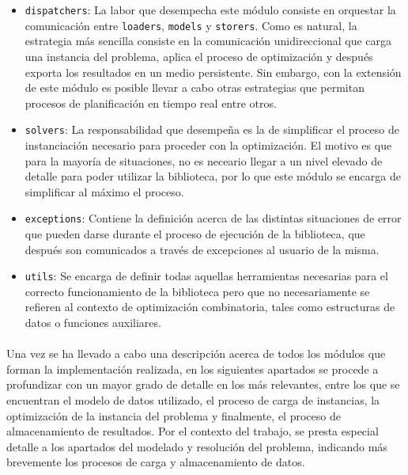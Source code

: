 \documentclass{subfiles}
\begin{document}
          \begin{itemize}

              \item \texttt{dispatchers}: La labor que desempecha este módulo consiste en orquestar la comunicación entre \texttt{loaders}, \texttt{models} y \texttt{storers}. Como es natural, la estrategia más sencilla consiste en la comunicación unidireccional que carga una instancia del problema, aplica el proceso de optimización y después exporta los resultados en un medio persistente. Sin embargo, con la extensión de este módulo es posible llevar a cabo otras estrategias que permitan procesos de planificación en tiempo real entre otros.

            \item \texttt{solvers}: La responsabilidad que desempeña es la de simplificar el proceso de instanciación necesario para proceder con la optimización. El motivo es que para la mayoría de situaciones, no es neceario llegar a un nivel elevado de detalle para poder utilizar la biblioteca, por lo que este módulo se encarga de simplificar al máximo el proceso.

            \item \texttt{exceptions}: Contiene la definición acerca de las distintas situaciones de error que pueden darse durante el proceso de ejecución de la biblioteca, que después son comunicados a través de excepciones al usuario de la misma.

            \item \texttt{utils}: Se encarga de definir todas aquellas herramientas necesarias para el correcto funcionamiento de la biblioteca pero que no necesariamente se refieren al contexto de optimización combinatoria, tales como estructuras de datos o funciones auxiliares.

          \end{itemize}

          \paragraph{}
          Una vez se ha llevado a cabo una descripción acerca de todos los módulos que forman la implementación realizada, en los siguientes apartados se procede a profundizar con un mayor grado de detalle en los más relevantes, entre los que se encuentran el modelo de datos utilizado, el proceso de carga de instancias, la optimización de la instancia del problema y finalmente, el proceso de almacenamiento de resultados. Por el contexto del trabajo, se presta especial detalle a los apartados del modelado y resolución del problema, indicando más brevemente los procesos de carga y almacenamiento de datos.
\end{document}
